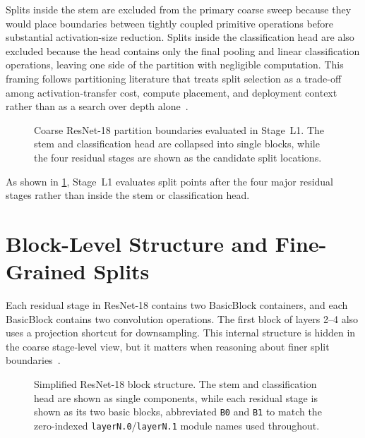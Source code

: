 Splits inside the stem are excluded from the primary coarse sweep because they would
place boundaries between tightly coupled primitive operations before substantial
activation-size reduction. Splits inside the classification head are also excluded
because the head contains only the final pooling and linear classification operations,
leaving one side of the partition with negligible computation. This framing follows
partitioning literature that treats split selection as a trade-off among
activation-transfer cost, compute placement, and deployment context rather than as a
search over depth alone~\cite{dnnsplit,deeperthings,survey_partitioning}.

\begin{figure}[htbp]
\centering
%
\caption[Coarse ResNet-18 partition boundaries (Stage~L1)]{Coarse ResNet-18 partition boundaries evaluated in Stage~L1. The stem and classification head are collapsed into single blocks, while the four residual stages are shown as the candidate split locations.}
\label{fig:rq11_coarse_split_boundaries}
\end{figure}

As shown in \cref{fig:rq11_coarse_split_boundaries}, Stage~L1 evaluates split
points after the four major residual stages rather than inside the stem or
classification head.

\section{Block-Level Structure and Fine-Grained Splits}
\label{sec:bg-block-granularity}

Each residual stage in ResNet-18 contains two BasicBlock containers, and each
BasicBlock contains two convolution operations. The first block of layers 2--4 also
uses a projection shortcut for downsampling. This internal structure is hidden in the
coarse stage-level view, but it matters when reasoning about finer split
boundaries~\cite{resnet}.

\begin{figure}[htbp]
\centering
%
\caption[Simplified ResNet-18 block structure]{Simplified ResNet-18 block structure. The stem and classification head are shown as single components, while each residual stage is shown as its two basic blocks, abbreviated \texttt{B0} and \texttt{B1} to match the zero-indexed \texttt{layerN.0}/\texttt{layerN.1} module names used throughout.}
\label{fig:resnet18_block_structure}
\end{figure}

